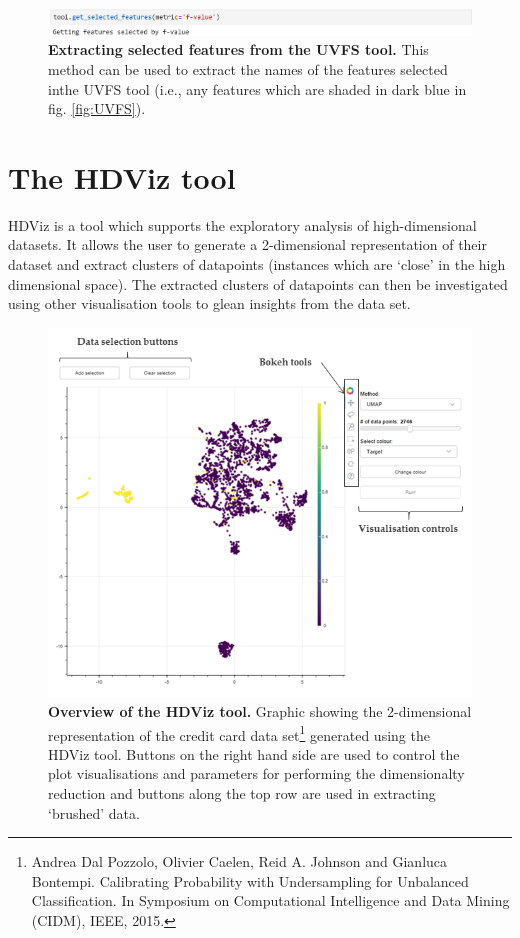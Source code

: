 \documentclass[11pt]{article} %
\begin{document}
\begin{figure}[!h]
\centering
\includegraphics[width=5.75in]{images/UVFS_get_features.png}
\caption{\textbf{Extracting selected features from the UVFS tool.} This method can be used to extract the names of the features selected inthe UVFS tool (i.e., any features which are shaded in dark blue in fig. \ref{fig:UVFS}).}
\label{fig:UVFS_features}
\end{figure}

\section{The HDViz tool}

HDViz is a tool which supports the exploratory analysis of high-dimensional datasets. It allows the user to generate a 2-dimensional representation of their dataset and extract clusters of datapoints (instances which are `close' in the high dimensional space). The extracted clusters of datapoints can then be investigated using other visualisation tools to glean insights from the data set.

\begin{figure}[!h]
\centering
\includegraphics[width=4.5in]{images/HDViz_tool_annotated.png}
\caption{\textbf{Overview of the HDViz tool.} Graphic showing the 2-dimensional representation of the credit card data set\protect\footnote{Andrea Dal Pozzolo, Olivier Caelen, Reid A. Johnson and Gianluca Bontempi. Calibrating Probability with Undersampling for Unbalanced Classification. In Symposium on Computational Intelligence and Data Mining (CIDM), IEEE, 2015.} generated using the HDViz tool. Buttons on the right hand side are used to control the plot visualisations and parameters for performing the dimensionalty reduction and buttons along the top row are used in extracting `brushed' data.}
\label{fig:HDplot}
\end{figure}
\end{document}

